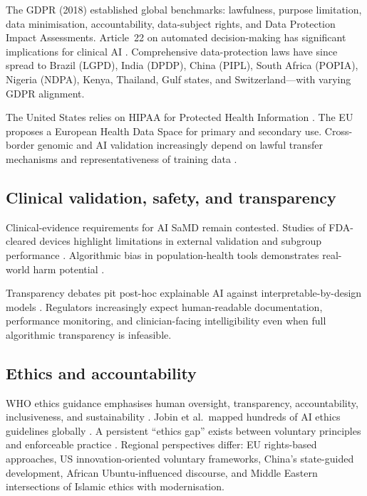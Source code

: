 \documentclass[12pt,a4paper]{report}
\begin{document}
The GDPR (2018) established global benchmarks: lawfulness, purpose limitation, data minimisation, accountability, data-subject rights, and Data Protection Impact Assessments. Article~22 on automated decision-making has significant implications for clinical AI \cite{goodman2017}. Comprehensive data-protection laws have since spread to Brazil (LGPD), India (DPDP), China (PIPL), South Africa (POPIA), Nigeria (NDPA), Kenya, Thailand, Gulf states, and Switzerland---with varying GDPR alignment.

The United States relies on HIPAA for Protected Health Information \cite{cohen2018}. The EU proposes a European Health Data Space for primary and secondary use. Cross-border genomic and AI validation increasingly depend on lawful transfer mechanisms and representativeness of training data \cite{gerke2020}.

\subsection{Clinical validation, safety, and transparency}

Clinical-evidence requirements for AI SaMD remain contested. Studies of FDA-cleared devices highlight limitations in external validation and subgroup performance \cite{wu2021}. Algorithmic bias in population-health tools demonstrates real-world harm potential \cite{obermeyer2019,seyedkalantari2021}.

Transparency debates pit post-hoc explainable AI against interpretable-by-design models \cite{ghassemi2021,rudin2019}. Regulators increasingly expect human-readable documentation, performance monitoring, and clinician-facing intelligibility even when full algorithmic transparency is infeasible.

\subsection{Ethics and accountability}

WHO ethics guidance emphasises human oversight, transparency, accountability, inclusiveness, and sustainability \cite{who2021}. Jobin et al.\ mapped hundreds of AI ethics guidelines globally \cite{jobin2019}. A persistent ``ethics gap'' exists between voluntary principles and enforceable practice \cite{mittelstadt2019,morley2020}. Regional perspectives differ: EU rights-based approaches, US innovation-oriented voluntary frameworks, China's state-guided development, African Ubuntu-influenced discourse, and Middle Eastern intersections of Islamic ethics with modernisation.
\end{document}
